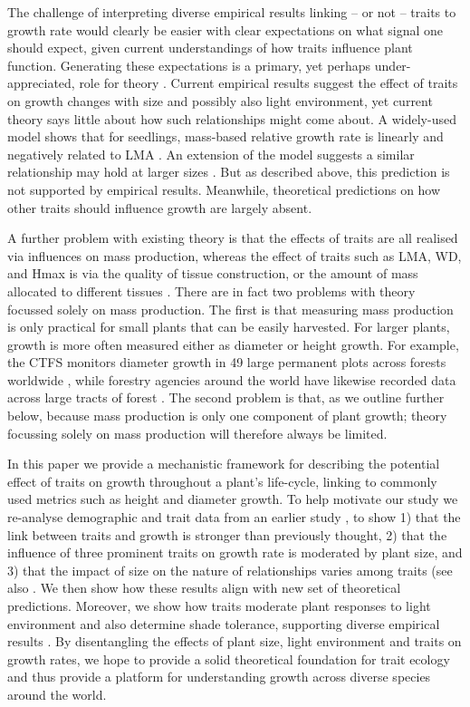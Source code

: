 \documentclass[12pt, a4paper]{article}
\begin{document}
The challenge of interpreting diverse empirical results linking  -- or not --
traits to growth rate would clearly be easier with clear expectations on what
signal one should expect, given current understandings of how traits influence
plant function. Generating these expectations is a primary, yet perhaps under-
appreciated, role for theory \citep{kokko-2007}. Current empirical
results suggest the effect of traits on growth changes with size and possibly
also light environment, yet current theory says little about how such
relationships might come about. A widely-used model shows that for seedlings,
mass-based relative growth rate is linearly and negatively related to LMA
\citep{lambers-1992, cornelissen-1996,
wright_cross-2000}. An extension of the model suggests a similar
relationship may hold at larger sizes \citep{enquist-2007}. But as
described above, this prediction is not supported by empirical results.
Meanwhile, theoretical predictions on how other traits should influence growth
are largely absent.

A further problem with existing theory is that the effects of traits are all
realised via influences on mass production\citep{enquist-2007},
whereas the effect of traits such as LMA, WD, and Hmax is via the quality of
tissue construction, or the amount of mass allocated to different tissues
\citep{falster-2011}. There are in fact two problems with theory
focussed solely on mass production. The first is that measuring mass
production is only practical for small plants that can be easily harvested.
For larger plants, growth is more often measured either as diameter or height
growth. For example, the CTFS monitors diameter growth in 49 large permanent
plots across forests worldwide \citep{anderson_teixeira_ctfs-2014},
while forestry agencies around the world have likewise recorded data across
large tracts of forest \citep{purves-2008}. The second problem is
that, as we outline further below, because mass production is only one
component of plant growth; theory focussing solely on mass production will
therefore always be limited.

In this paper we provide a mechanistic framework for describing the potential
effect of traits on growth throughout a plant's life-cycle, linking to
commonly used metrics such as height and diameter growth. To help motivate our
study we re-analyse demographic and trait data from an earlier study
\citep{wright-2010}, to show 1) that the link between traits and
growth is stronger than previously thought, 2) that the influence of three
prominent traits on growth rate is moderated by plant size, and 3) that the
impact of size on the nature of relationships varies among traits (see also
\citet{ruger-2012}. We then show how these results align with new
set of theoretical predictions. Moreover, we show how traits moderate plant
responses to light environment and also determine shade tolerance, supporting
diverse empirical results \citep{ruger-2012, poorter-2006}. By
disentangling the effects of plant size, light environment and traits on
growth rates, we hope to provide a solid theoretical foundation for trait
ecology and thus provide a platform for understanding growth across diverse
species around the world.
\end{document}
